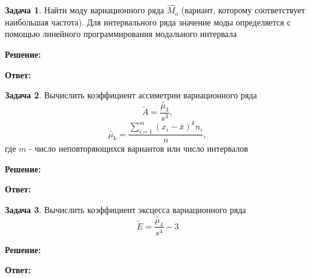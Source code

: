 \documentclass[a4paper,12pt]{article}
\theoremstyle{definition}
\newtheorem{problem}{Задача}
\newenvironment{solution}
{\begin{shaded}\textbf{Решение:}\par\setlength{\parindent}{0pt}}
{\end{shaded}}
\newenvironment{answer}
{\par\noindent\textbf{Ответ:} }
{\par}
\begin{document}
\vspace{8pt}
\begin{problem}
    Найти моду вариационного ряда \(\hat{M_o}\) (вариант, которому соответствует
    наибольшая частота). Для интервального ряда значение моды определяется с
    помощью линейного программирования модального интервала
    
        \begin{solution}
        \end{solution}
    
        \begin{answer}
        \end{answer}
    
    \end{problem}




\vspace{8pt}
\begin{problem}
    Вычислить коэффициент ассиметрии вариационного ряда
    \[\tilde{A} = \frac{\tilde{\mu_3}}{s^3},\]
    \[\tilde{\mu_k} = \frac{\sum^m_{i=1}(x_i - \bar{x})^k n_i}{n},\]
    где \(m\) - число неповторяющихся вариантов или число интервалов     
        \begin{solution}
        \end{solution}
    
        \begin{answer}
        \end{answer}
    
    \end{problem}

\vspace{8pt}
\begin{problem}
    Вычислить коэффициент эксцесса вариационного ряда
    \[\tilde{E} = \frac{\tilde{\mu_4}}{s^4} - 3\]
    
        \begin{solution}
        \end{solution}
    
        \begin{answer}
        \end{answer}
    
    \end{problem}
\end{document}

